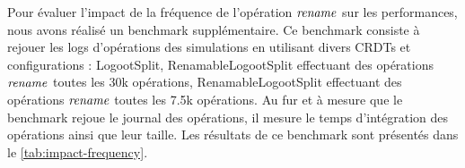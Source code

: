 Pour évaluer l'impact de la fréquence de l'opération $\mathit{rename}$ sur les performances, nous avons réalisé un benchmark supplémentaire.
Ce benchmark consiste à rejouer les logs d'opérations des simulations en utilisant divers \acp{CRDT} et configurations : LogootSplit, RenamableLogootSplit effectuant des opérations $\mathit{rename}$ toutes les 30k opérations, RenamableLogootSplit effectuant des opérations $\mathit{rename}$ toutes les 7.5k opérations.
Au fur et à mesure que le benchmark rejoue le journal des opérations, il mesure le temps d'intégration des opérations ainsi que leur taille.
Les résultats de ce benchmark sont présentés dans le \autoref{tab:impact-frequency}.

\begin{table}[!ht]
  \centering
\end{table}
